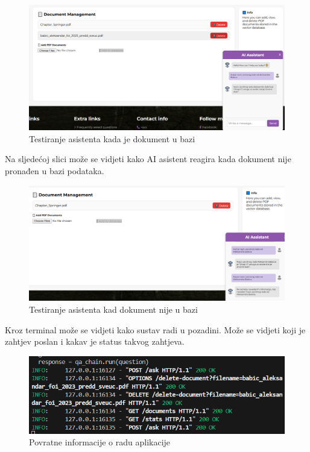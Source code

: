\documentclass[]{foi}
\begin{document}
\begin{figure}[ht]
  \centering
  \includegraphics[width=1\textwidth]{./assets/asistent1.png}
  \caption{Testiranje asistenta kada je dokument u bazi}
  \label{fig:slika99}
\end{figure}

Na sljedećoj slici može se vidjeti kako AI asistent reagira kada dokument nije pronađen u bazi podataka.

\begin{figure}[ht]
  \centering
  \includegraphics[width=1\textwidth]{./assets/asistent2.png}
  \caption{Testiranje asistenta kad dokument nije u bazi}
  \label{fig:slika100}
\end{figure}
\newpage

Kroz terminal može se vidjeti kako sustav radi u pozadini. Može se vidjeti koji je zahtjev poslan i kakav je status takvog zahtjeva.

\begin{figure}[ht]
  \centering
  \includegraphics[width=1\textwidth]{./assets/statzs.png}
  \caption{Povratne informacije o radu aplikacije}
  \label{fig:slika101}
\end{figure}
\end{document}
